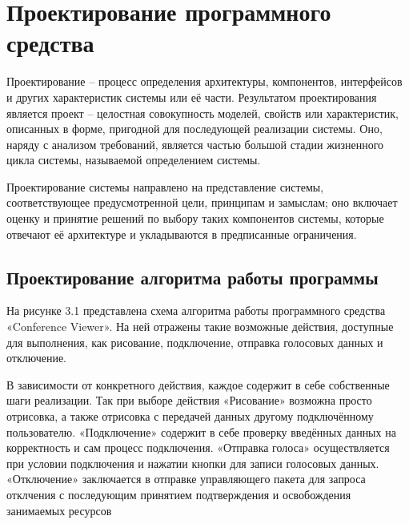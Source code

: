 \section{Проектирование программного средства}
\label{sec:design}

Проектирование – процесс определения архитектуры, компонентов, интерфейсов и других характеристик системы или её части. Результатом проектирования является проект – целостная совокупность моделей, свойств или характеристик, описанных в форме, пригодной для последующей реализации системы. Оно, наряду с анализом требований, является частью большой стадии жизненного цикла системы, называемой определением системы. 

Проектирование системы направлено на представление системы, соответствующее предусмотренной цели, принципам и замыслам; оно включает оценку и принятие решений по выбору таких компонентов системы, которые отвечают её архитектуре и укладываются в предписанные ограничения.

\subsection{Проектирование алгоритма работы программы}
\label{sec:design:algorithm}

На рисунке 3.1 представлена схема алгоритма работы программного средства «Conference Viewer». 
На ней отражены такие возможные действия, доступные для выполнения, как рисование, подключение, отправка голосовых данных и отключение. 

В зависимости от конкретного действия, каждое содержит в себе собственные шаги реализации. Так при выборе действия «Рисование» возможна просто отрисовка, а также отрисовка с передачей данных другому подключённому пользователю. «Подключение» содержит в себе проверку введённых данных на корректность и сам процесс подключения. «Отправка голоса» осуществляется при условии подключения и нажатии кнопки для записи голосовых данных. «Отключение» заключается в отправке управляющего пакета для запроса отклчения с последующим принятием подтверждения и освобождения занимаемых ресурсов

